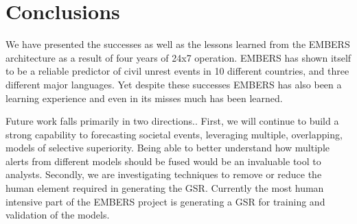 \section{Conclusions}
We have presented the successes as well as the lessons learned from the EMBERS
architecture as a result of four years of 24x7 operation.  EMBERS has shown
itself to be a reliable predictor of civil unrest events in 10 different
countries, and three different major languages.  Yet despite these successes
EMBERS has also been a learning experience and even in its misses much has been
learned.

Future work falls primarily in two directions..
First, we will continue
to build a strong capability to forecasting societal events,
leveraging multiple, overlapping,
models of selective superiority.
Being able to better understand how multiple
alerts from different models should be fused would 
be an invaluable tool to analysts.
Secondly, we are investigating
techniques to remove or reduce the human element required in generating 
the GSR.  Currently the most human intensive part of the EMBERS project 
is generating a GSR for training and validation of the models.

